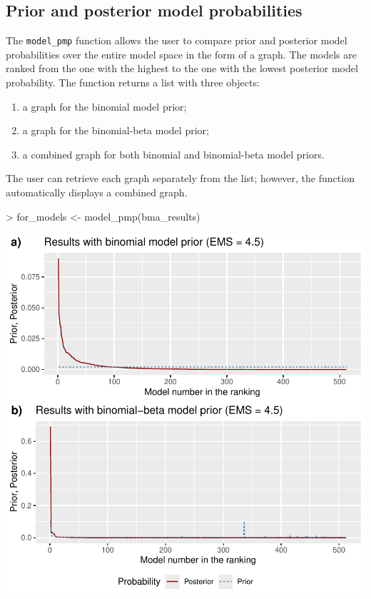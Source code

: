 \documentclass[a4paper]{article}
\begin{document}
\subsection{Prior and posterior model probabilities}
The \verb+model_pmp+ function allows the user to compare prior and posterior model probabilities over the entire model space in the form of a graph. The models are ranked from the one with the highest to the one with the lowest posterior model probability. The function returns a list with three objects:
\begin{enumerate}
    \item a graph for the binomial model prior;
    \item a graph for the binomial-beta model prior;
    \item a combined graph for both binomial and binomial-beta model priors.
\end{enumerate}
The user can retrieve each graph separately from the list; however, the function automatically displays a combined graph.
\begin{Schunk}
\begin{Sinput}
> for_models <- model_pmp(bma_results)
\end{Sinput}
\end{Schunk}
\includegraphics{bdsm_vignette-014}
\end{document}
